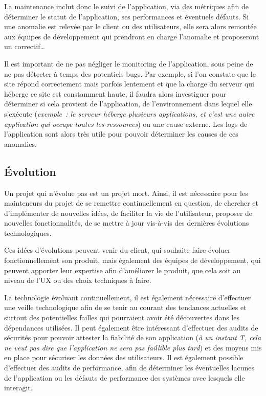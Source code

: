 La maintenance inclut donc le suivi de l'application, via des métriques afin de déterminer le statut de l'application, ses performances et éventuels défauts. Si une anomalie est relevée par le client ou des utilisateurs, elle sera alors remontée aux équipes de développement qui prendront en charge l'anomalie et proposeront un correctif\ldots

Il est important de ne pas négliger le monitoring de l'application, sous peine de ne pas détecter à temps des potentiels bugs. Par exemple, si l'on constate que le site répond correctement mais parfois lentement et que la charge du serveur qui héberge ce site est constamment haute, il faudra alors investiguer pour déterminer si cela provient de l'application, de l'environnement dans lequel elle s'exécute (\emph{exemple : le serveur héberge plusieurs applications, et c'est une autre application qui occupe toutes les ressources}) ou une cause externe. Les logs de l'application sont alors très utile pour pouvoir déterminer les causes de ces anomalies.

\subsection{Évolution}

Un projet qui n'évolue pas est un projet mort. Ainsi, il est nécessaire pour les mainteneurs du projet de se remettre continuellement en question, de chercher et d'implémenter de nouvelles idées, de faciliter la vie de l'utilisateur, proposer de nouvelles fonctionnalités, de se mettre à jour vis-à-vis des dernières évolutions technologiques. 

Ces idées d'évolutions peuvent venir du client, qui souhaite faire évoluer fonctionnellement son produit, mais également des équipes de développement, qui peuvent apporter leur expertise afin d'améliorer le produit, que cela soit au niveau de l'\gls{UX} ou des choix techniques à faire.

La technologie évoluant continuellement, il est également nécessaire d'effectuer une veille technologique afin de se tenir au courant des tendances actuelles et surtout des potentielles failles qui pourraient avoir été découvertes dans les dépendances utilisées. Il peut également être intéressant d'effectuer des audits de sécurités pour pouvoir attester la fiabilité de son application (\emph{à un instant T, cela ne veut pas dire que l'application ne sera pas faillible plus tard}) et des moyens mis en place pour sécuriser les données des utilisateurs. Il est également possible d'effectuer des audits de performance, afin de déterminer les éventuelles lacunes de l'application ou les défauts de performance des systèmes avec lesquels elle interagit.


